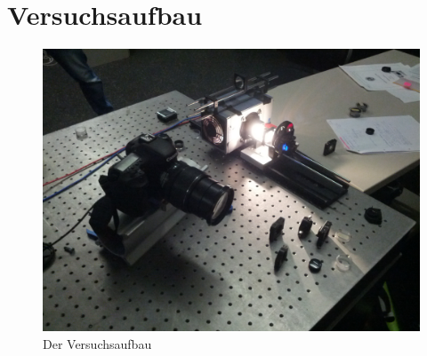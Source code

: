 \section{Versuchsaufbau}

\begin{figure}[h!]
	\includegraphics[width=\linewidth]{img/Versuchsaufbau}
	\caption{Der Versuchsaufbau}
	\label{fig:versuchsaufbau}
\end{figure}

